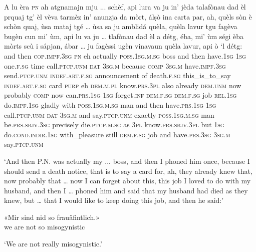 \begin{linenumbers}
\gll  A lu èra \textsc{pn} ah atgnamajn mju ... schèf, api lura va ju in’ jèda talafònau dad èl prquaj tg' èl vèva tarmèz in’ anunzja da mòrt, álṣò ina carta par, ah, quèls sòn è schòn quaj, ùsa mataj tgé … ùsa sa ju amblidá quèla, quèla lavur tgu fagèva bugèn cun mi' ùm, api lu va ju … tlafònau dad èl a détg, éba, mi' ùm ségi èba mòrts scù i sápjan, ábar … ju fagèssi ugèn vinavaun quèla lavur, api ò `l détg:  \\
and then \textsc{cop.impf.3sg} \textsc{pn} eh actually \textsc{poss.1sg.m.sg} {} boss and then have.\textsc{1sg}  \textsc{1sg} one.\textsc{f.sg} time call.\textsc{ptcp.unm} \textsc{dat} \textsc{3sg.m} because \textsc{comp} \textsc{3sg.m} have.\textsc{impf.3sg} send.\textsc{ptcp.unm} \textsc{indef.art.f.sg} announcement of death.\textsc{f.sg} this\_is\_to\_say \textsc{indef.art.f.sg} card \textsc{purp} eh \textsc{dem.m.pl} know.\textsc{prs.3pl} also already \textsc{dem.unm} now probably \textsc{comp} {} now can.\textsc{prs.1sg} \textsc{1sg} forget.\textsc{inf} \textsc{dem.f.sg} \textsc{dem.f.sg} job \textsc{rel.1sg} do.\textsc{impf.1sg} gladly\footnotemark{} with \textsc{poss.1sg.m.sg} man and then have.\textsc{prs.1sg} \textsc{1sg} {} call.\textsc{ptcp.unm} \textsc{dat} \textsc{3sg.m} and say.\textsc{ptcp.unm} exactly \textsc{poss.1sg.m.sg} man be.\textsc{prs.sbjv.3sg} precisely die.\textsc{ptcp.m.sg} as \textsc{3pl} know.\textsc{prs.sbjv.3pl} but \textsc{1sg} {} do.\textsc{cond.indir.1sg} with\_pleasure still \textsc{dem.f.sg} job and have.\textsc{prs.3sg} \textsc{3sg.m} say.\textsc{ptcp.unm}\\ 
\end{linenumbers}
\medskip
\glt `And then P.N. was actually my ... boss, and then I phoned him once, because I should send a death notice, that is to say a card for, ah, they already knew that, now probably that … now I can forget about this, this job I loved to do with my husband, and then I … phoned him and said that my husband had died as they knew, but … that I would like to keep doing this job, and then he said:'
\medskip

\begin{linenumbers}
\gll  «Mir sind nid so frauäfintlich.»\footnotemark   \\
we are not so misogynistic  \\
\end{linenumbers}
\medskip
\glt `We are not really misogynistic.'
\medskip

